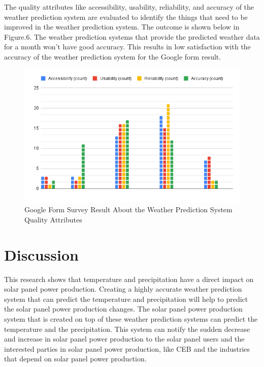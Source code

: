 \documentclass[conference]{IEEEtran}
\begin{document}
The quality attributes like accessibility, usability, reliability, and accuracy of the weather prediction system are evaluated to identify the things that need to be improved in the weather prediction system. The outcome is shown below in Figure.6. The weather prediction systems that provide the predicted weather data for a month won't have good accuracy. This results in low satisfaction with the accuracy of the weather prediction system for the Google form result. 

\begin{figure}[htp]
    \centering
    \includegraphics[width=\linewidth]{Images/overall quality.png}
    \caption{Google Form Survey Result About the Weather Prediction System Quality Attributes}
    \label{fig:GoogleFormResult }
\end{figure}

\section{Discussion}

This research shows that temperature and precipitation have a direct impact on solar panel power production. Creating a highly accurate weather prediction system that can predict the temperature and precipitation will help to predict the solar panel power production changes. The solar panel power production system that is created on top of these weather prediction systems can predict the temperature and the precipitation. This system can notify the sudden decrease and increase in solar panel power production to the solar panel users and the interested parties in solar panel power production, like CEB and the industries that depend on solar panel power production.
\end{document}
